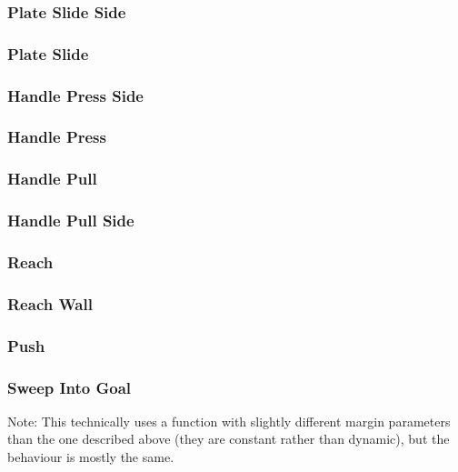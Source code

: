 {\subsubsection{Plate Slide Side}



\subsubsection{Plate Slide}


\subsubsection{Handle Press Side}


\subsubsection{Handle Press}


\subsubsection{Handle Pull}



\subsubsection{Handle Pull Side}



\subsubsection{Reach}


\subsubsection{Reach Wall}


\subsubsection{Push}



\subsubsection{Sweep Into Goal}
Note: This technically uses a  function with slightly different margin parameters than the one described above (they are constant rather than dynamic), but the behaviour is mostly the same.


}
